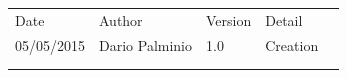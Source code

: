 \documentclass[a4paper,11pt]{book}
\begin{document}
\begin{table}[h]
\begin{tabular}{lllll}
\cline{1-4}
\multicolumn{1}{|l|}{Date}       & \multicolumn{1}{l|}{Author}         & \multicolumn{1}{l|}{Version} & \multicolumn{1}{l|}{Detail}   &  \\ \cline{1-4}
\multicolumn{1}{|l|}{05/05/2015} & \multicolumn{1}{l|}{Dario Palminio} & \multicolumn{1}{l|}{1.0}     & \multicolumn{1}{l|}{Creation} &  \\ \cline{1-4}
                                 &                                     &                              &                               &  \\
                                 &                                     &                              &                               & 
\end{tabular}
\end{table}
\end{document}
